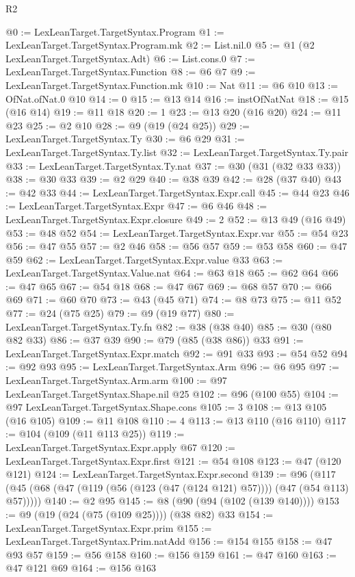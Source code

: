 \begin{lexlean}{R2}
\begin{coremodule}
{{{{{{{{{{{{{{{{{{{{{{@0 := LexLeanTarget.TargetSyntax.Program
@1 := LexLeanTarget.TargetSyntax.Program.mk
@2 := List.nil.{0}
@5 := @1 (@2 LexLeanTarget.TargetSyntax.Adt)
@6 := List.cons.{0}
@7 := LexLeanTarget.TargetSyntax.Function
@8 := @6 @7
@9 := LexLeanTarget.TargetSyntax.Function.mk
@10 := Nat
@11 := @6 @10
@13 := OfNat.ofNat.{0} @10
@14 := 0
@15 := @13 @14
@16 := instOfNatNat
@18 := @15 (@16 @14)
@19 := @11 @18
@20 := 1
@23 := @13 @20 (@16 @20)
@24 := @11 @23
@25 := @2 @10
@28 := @9 (@19 (@24 @25))
@29 := LexLeanTarget.TargetSyntax.Ty
@30 := @6 @29
@31 := LexLeanTarget.TargetSyntax.Ty.list
@32 := LexLeanTarget.TargetSyntax.Ty.pair
@33 := LexLeanTarget.TargetSyntax.Ty.nat
@37 := @30 (@31 (@32 @33 @33))
@38 := @30 @33
@39 := @2 @29
@40 := @38 @39
@42 := @28 (@37 @40)
@43 := @42 @33
@44 := LexLeanTarget.TargetSyntax.Expr.call
@45 := @44 @23
@46 := LexLeanTarget.TargetSyntax.Expr
@47 := @6 @46
@48 := LexLeanTarget.TargetSyntax.Expr.closure
@49 := 2
@52 := @13 @49 (@16 @49)
@53 := @48 @52
@54 := LexLeanTarget.TargetSyntax.Expr.var
@55 := @54 @23
@56 := @47 @55
@57 := @2 @46
@58 := @56 @57
@59 := @53 @58
@60 := @47 @59
@62 := LexLeanTarget.TargetSyntax.Expr.value @33
@63 := LexLeanTarget.TargetSyntax.Value.nat
@64 := @63 @18
@65 := @62 @64
@66 := @47 @65
@67 := @54 @18
@68 := @47 @67
@69 := @68 @57
@70 := @66 @69
@71 := @60 @70
@73 := @43 (@45 @71)
@74 := @8 @73
@75 := @11 @52
@77 := @24 (@75 @25)
@79 := @9 (@19 @77)
@80 := LexLeanTarget.TargetSyntax.Ty.fn
@82 := @38 (@38 @40)
@85 := @30 (@80 @82 @33)
@86 := @37 @39
@90 := @79 (@85 (@38 @86)) @33
@91 := LexLeanTarget.TargetSyntax.Expr.match
@92 := @91 @33
@93 := @54 @52
@94 := @92 @93
@95 := LexLeanTarget.TargetSyntax.Arm
@96 := @6 @95
@97 := LexLeanTarget.TargetSyntax.Arm.arm
@100 := @97 LexLeanTarget.TargetSyntax.Shape.nil @25
@102 := @96 (@100 @55)
@104 := @97 LexLeanTarget.TargetSyntax.Shape.cons
@105 := 3
@108 := @13 @105 (@16 @105)
@109 := @11 @108
@110 := 4
@113 := @13 @110 (@16 @110)
@117 := @104 (@109 (@11 @113 @25))
@119 := LexLeanTarget.TargetSyntax.Expr.apply @67
@120 := LexLeanTarget.TargetSyntax.Expr.first
@121 := @54 @108
@123 := @47 (@120 @121)
@124 := LexLeanTarget.TargetSyntax.Expr.second
@139 := @96 (@117 (@45 (@68 (@47 (@119 (@56 (@123 (@47 (@124 @121) @57)))) (@47 (@54 @113) @57)))))
@140 := @2 @95
@145 := @8 (@90 (@94 (@102 (@139 @140))))
@153 := @9 (@19 (@24 (@75 (@109 @25)))) (@38 @82) @33
@154 := LexLeanTarget.TargetSyntax.Expr.prim
@155 := LexLeanTarget.TargetSyntax.Prim.natAdd
@156 := @154 @155
@158 := @47 @93 @57
@159 := @56 @158
@160 := @156 @159
@161 := @47 @160
@163 := @47 @121 @69
@164 := @156 @163
}}}}}}}}}}}}}}}}}}}}}}
\end{coremodule}
\end{lexlean}
